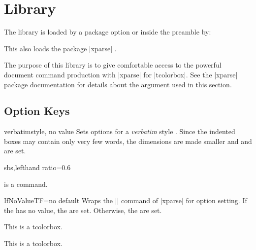 \clearpage
\section{Library }\label{sec:xparse}%
%
The library is loaded by a package option or inside the preamble by:
\begin{dispListing}
\end{dispListing}
This also loads the package |xparse| \cite{latexproject:2015a}.

The purpose of this library is to give comfortable access to the
powerful document command production with |xparse| for |tcolorbox|.
See the |xparse| package documentation \cite{latexproject:2015a}
for details about the argument  used in this section.



\subsection{Option Keys}\label{subsec:xparse_options}

\begin{docTcbKey}{verbatim}{}{style, no value}
  Sets options for a \textit{verbatim} style .
  Since the indented boxes may contain only very few words, the
  dimensions are made smaller and 
  and  are set.
\begin{dispExample*}{sbs,lefthand ratio=0.6}

\myverb{\textbf} is a \myverb{\LaTeX} command.
\end{dispExample*}
\end{docTcbKey}


\begin{docTcbKey}{IfNoValueTF}{=}{no default}
  Wraps the |\IfNoValueTF| command of |xparse| for option setting.
  If the  has no value, the  are set.
  Otherwise, the  are set.
\begin{dispExample}

\begin{mybox}
This is a tcolorbox.
\end{mybox}

\begin{mybox}
This is a tcolorbox.
\end{mybox}
\end{dispExample}
\end{docTcbKey}

